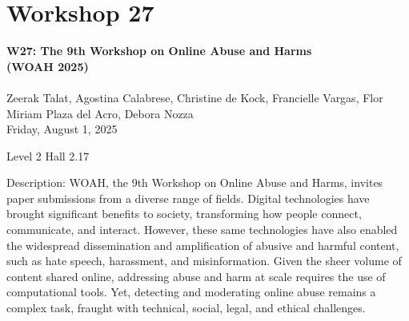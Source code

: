 \clearpage


\section[W27: The 9th Workshop on Online Abuse and Harms (WOAH 2025) ]{Workshop 27}
\label{workshop_27}

\begin{center}
    {\Large \textbf{W27: The 9th Workshop on Online Abuse and Harms\\
    (WOAH 2025) }}\\
    
\\

Zeerak Talat, Agostina Calabrese, Christine de Kock, Francielle Vargas, Flor Miriam Plaza del Acro, Debora Nozza\\

    Friday, August 1, 2025

Level 2 Hall 2.17

\end{center}

Description: WOAH, the 9th Workshop on Online Abuse and Harms, invites paper submissions from a diverse range of fields. Digital technologies have brought significant benefits to society, transforming how people connect, communicate, and interact. However, these same technologies have also enabled the widespread dissemination and amplification of abusive and harmful content, such as hate speech, harassment, and misinformation. Given the sheer volume of content shared online, addressing abuse and harm at scale requires the use of computational tools. Yet, detecting and moderating online abuse remains a complex task, fraught with technical, social, legal, and ethical challenges. 

